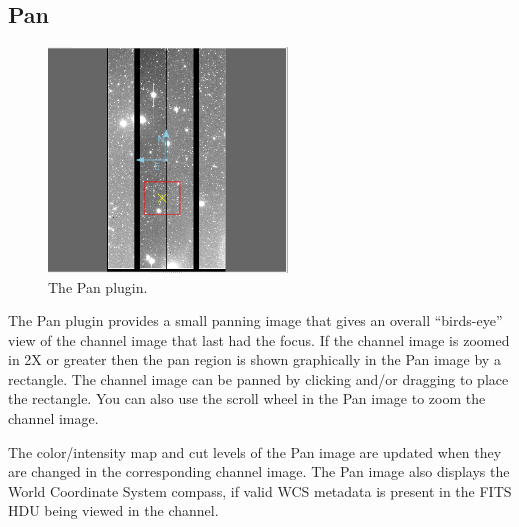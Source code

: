 \documentclass[11pt]{report}
\begin{document}
\newpage
\subsection{Pan}
\begin{figure}
  \includegraphics[width=2.5in]{pan-plugin.png}
  \caption[example] 
          { \label{fig:pan-plugin} 
            The Pan plugin.} 
\end{figure} 
The Pan plugin provides a small panning image that gives an overall
``birds-eye'' view of the channel image that last had the focus.  If the
channel image is zoomed in 2X or greater then the pan region is shown
graphically in the Pan image by a rectangle.  The channel image can be
panned by clicking and/or dragging to place the rectangle.  You can also
use the scroll wheel in the Pan image to zoom the channel image.

The color/intensity map and cut levels of the Pan image are updated
when they are changed in the corresponding channel image.
The Pan image also displays the World Coordinate System compass, if
valid WCS metadata is present in the FITS HDU being viewed in the
channel.

\newpage
\end{document}
